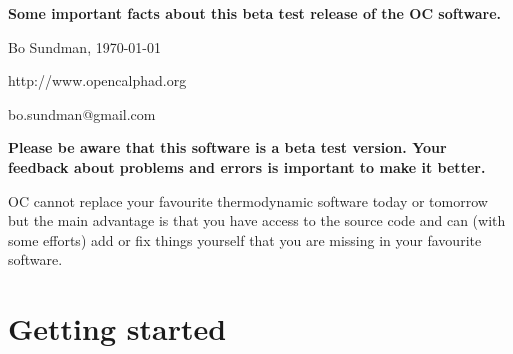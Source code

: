 \documentclass[12pt]{article}
\begin{document}
\begin{center}
{\Large \bf Some important facts about this beta test release of the
OC software.}

Bo Sundman, \today

http://www.opencalphad.org

bo.sundman@gmail.com
\end{center}

{\large \bf Please be aware that this software is a beta test version.
Your feedback about problems and errors is important to make it
better.}

OC cannot replace your favourite thermodynamic software today or
tomorrow but the main advantage is that you have access to the source
code and can (with some efforts) add or fix things yourself that you
are missing in your favourite software.

\section{Getting started}
\end{document}
